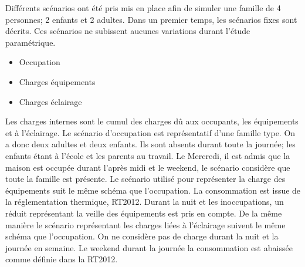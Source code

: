Différents scénarios ont été pris mis en place afin de simuler une famille de 4 personnes;
2 enfants et 2 adultes. Dans un premier temps, les scénarios fixes sont décrits. Ces scénarios
ne subissent aucunes variations durant l’étude paramétrique.
\begin{itemize}
    \item Occupation %
    \item Charges équipements %
    \item Charges éclairage %
\end{itemize} 
Les charges internes sont le cumul des charges dû aux occupants, les équipements et à l’éclairage.
Le scénario d’occupation est représentatif d’une famille type.
On a donc deux adultes et deux enfants. Ils sont absents durant toute la journée;
les enfants étant à l’école et les parents au travail. Le Mercredi, il est admis que
la maison est occupée durant l’après midi et le weekend, le scénario
considère que toute la famille est présente.
Le scénario utilisé pour représenter la charge des équipements suit le même schéma que
l’occupation. La consommation est issue de la réglementation thermique, RT2012. Durant la nuit et les
inoccupations, un réduit représentant la veille des équipements est pris en compte.
De la même manière le scénario représentant les charges liées à l’éclairage suivent
le même schéma que l’occupation. On ne considère pas de charge durant la nuit et la
journée en semaine. Le weekend durant la journée la consommation est abaissée comme
définie dans la RT2012.


